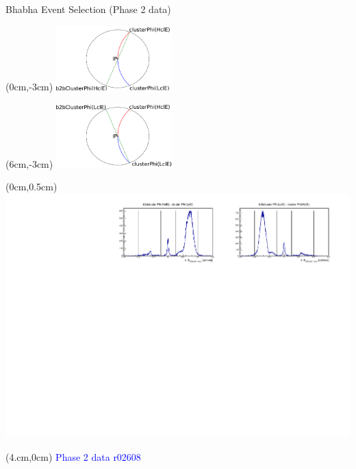\documentclass[10pt]{beamer}
\begin{document}
	
\begin{frame}{Bhabha Event Selection (Phase 2 data)}
	
	\begin{textblock*}{0.5\textwidth}(0cm,-3cm)
		\centering
		\includegraphics[width=4.5cm]{Plots/b2b_2}
	\end{textblock*}
	
	\begin{textblock*}{0.5\textwidth}(6cm,-3cm)
		\centering
		\includegraphics[width=4.5cm]{Plots/b2b_3}
	\end{textblock*}
	
	
	\begin{textblock*}{1\textwidth}(0cm,0.5cm)
		\centering
		\includegraphics[width=\textwidth]{Plots/Eff/b2b_Data.pdf}
	\end{textblock*}
	
	
	
	

		\begin{textblock*}{0.3\textwidth}(4.cm,0cm)
		\textcolor{blue}{Phase 2 data}		
		\textcolor{blue}{r02608}
	\end{textblock*}
	

	
	
	
	
	
\end{frame}
	
\end{document}
